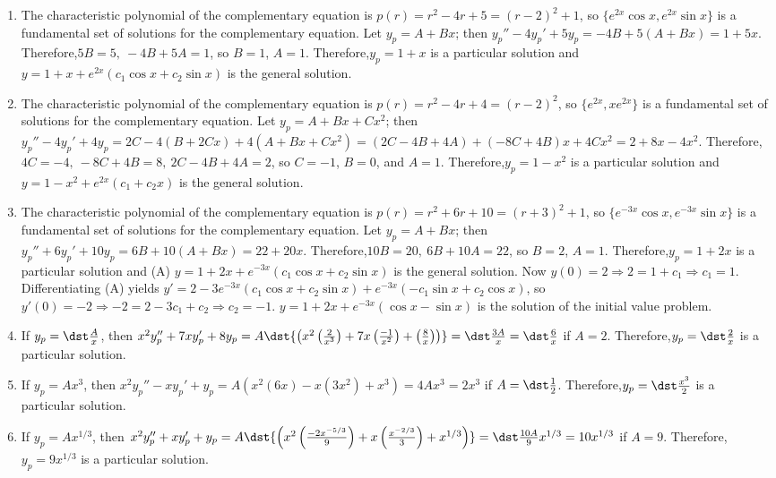 \documentclass[openany]{book}
\newenvironment{sectionSolutions}{
 \begin{enumerate}[item-label={\thesection.\arabic{enumi}.}]
}{
 \end{enumerate}
}
\begin{document}
\begin{sectionSolutions}
\item
The characteristic polynomial of the complementary equation is
$p(r)=r^2-4r+5=(r-2)^2+1$, so
$\{e^{2x}\cos x,e^{2x}\sin x\}$
is a fundamental set of solutions for the complementary equation.
Let $y_p=A+Bx$; then
$y_p''-4y_p'+5y_p=-4B+5(A+Bx)=1+5x$.
Therefore,$5B=5,\  -4B+5A=1$, so $B=1$, $A=1$.
Therefore,$y_p=1+x$ is a particular solution and
$y=1+x+e^{2x}(c_1\cos x+c_2\sin x)$ is the general solution.

\item
The characteristic polynomial of the complementary equation is
$p(r)=r^2-4r+4=(r-2)^2$, so  $\{e^{2x},xe^{2x}\}$
is a fundamental set of solutions for the complementary equation.
Let $y_p=A+Bx+Cx^2$; then
$y_p''-4y_p'+4y_p=2C-4(B+2Cx)+4(A+Bx+Cx^2)=(2C-4B+4A)+(-8C+4B)x+4Cx^2
=2+8x-4x^2$. Therefore,$4C=-4,\ -8C+4B=8,\
2C-4B+4A=2$, so $C=-1$, $B=0$, and $A=1$.
Therefore,$y_p=1-x^2$ is a particular solution and
 $y=1-x^2+e^{2x}(c_1+c_2x)$ is the general solution.


\item
The characteristic polynomial of the complementary equation is
$p(r)=r^2+6r+10=(r+3)^2+1$, so
$\{e^{-3x}\cos x,e^{-3x}\sin x\}$
is a fundamental set of solutions for the complementary equation.
Let $y_p=A+Bx$; then
$y_p''+6y_p'+10y_p=6B+10(A+Bx)=22+20x$.
Therefore,$10B=20,\  6B+10A=22$, so $B=2$, $A=1$.
Therefore,$y_p=1+2x$ is a particular solution and
(A) $y=1+2x+e^{-3x}(c_1\cos x+c_2\sin x)$ is the general solution.
Now $y(0)=2\Rightarrow 2=1+c_1\Rightarrow c_1=1$. Differentiating (A)
yields
$y'=2-3e^{-3x}(c_1\cos x+c_2\sin x) +e^{-3x}(-c_1\sin x+c_2\cos x)$,
so $y'(0)=-2\Rightarrow
-2=2-3c_1+c_2\Rightarrow c_2=-1$.
 $y=1+2x+e^{-3x}(\cos x-\sin x)$ is the solution of the initial
value problem.



\item
If $y_p=\dst\frac{A}{ x}$, then $x^2y_p''+7xy_p'+8y_p=
A\dst{\left(x^2\left(\frac{2}{ x^3}\right)+7x\left(\frac{-1}{
x^2}\right)+\left(\frac{8}{ x}\right)\right)}=\dst\frac{3A}{ x}=\dst\frac{6}{
x}$ if $A=2$. Therefore,$y_p=\dst\frac{2}{ x}$ is a particular solution.


\item
If $y_p=Ax^3$, then  $x^2y_p''-xy_p'+y_p=
A\left(x^2(6x)-x(3x^2)+x^3\right)=4Ax^3=2x^3$ if $A=\dst\frac{1}{2}$.
 Therefore,$y_p=\dst\frac{x^3}{2}$ is a particular solution.


\item
If $y_p=Ax^{1/3}$, then $x^2y_p''+xy_p'+y_p=
A\dst{\left(x^2\left(\frac{-2x^{-5/3}}{9}\right)+x\left(\frac{x^{-2/3}}{3}\right)
+x^{1/3}\right)}=\dst\frac{10A}{9}x^{1/3}=10x^{1/3}$
if $A=9$. Therefore,$y_p=9x^{1/3}$ is a particular solution.



\end{sectionSolutions}
\end{document}
